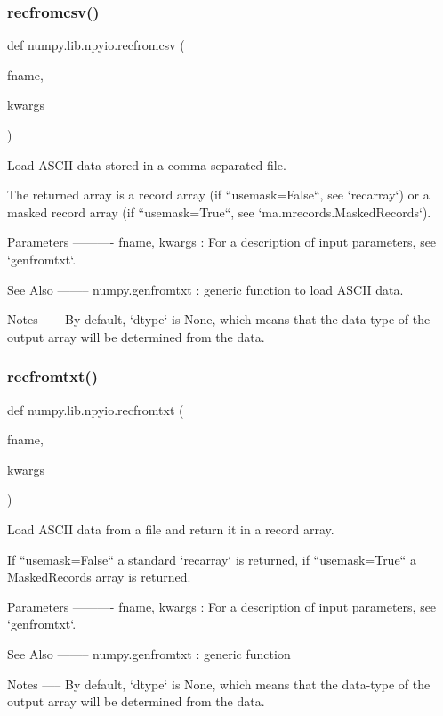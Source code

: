 \subsubsection{\texorpdfstring{recfromcsv()}{recfromcsv()}}
{\footnotesize\ttfamily def numpy.\+lib.\+npyio.\+recfromcsv (\begin{DoxyParamCaption}\item[{}]{fname,  }\item[{}]{kwargs }\end{DoxyParamCaption})}

\begin{DoxyVerb}Load ASCII data stored in a comma-separated file.

The returned array is a record array (if ``usemask=False``, see
`recarray`) or a masked record array (if ``usemask=True``,
see `ma.mrecords.MaskedRecords`).

Parameters
----------
fname, kwargs : For a description of input parameters, see `genfromtxt`.

See Also
--------
numpy.genfromtxt : generic function to load ASCII data.

Notes
-----
By default, `dtype` is None, which means that the data-type of the output
array will be determined from the data.\end{DoxyVerb}
 \mbox{\label{namespacenumpy_1_1lib_1_1npyio_aa31806efa16c668c2d70ae308515342d}} 
\subsubsection{\texorpdfstring{recfromtxt()}{recfromtxt()}}
{\footnotesize\ttfamily def numpy.\+lib.\+npyio.\+recfromtxt (\begin{DoxyParamCaption}\item[{}]{fname,  }\item[{}]{kwargs }\end{DoxyParamCaption})}

\begin{DoxyVerb}Load ASCII data from a file and return it in a record array.

If ``usemask=False`` a standard `recarray` is returned,
if ``usemask=True`` a MaskedRecords array is returned.

Parameters
----------
fname, kwargs : For a description of input parameters, see `genfromtxt`.

See Also
--------
numpy.genfromtxt : generic function

Notes
-----
By default, `dtype` is None, which means that the data-type of the output
array will be determined from the data.\end{DoxyVerb}
 \mbox{\label{namespacenumpy_1_1lib_1_1npyio_ad0e60355b784a10313d0709a07d75cd6}} 
